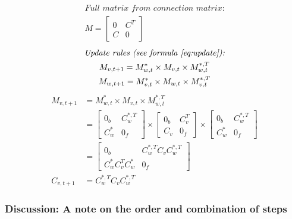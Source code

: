 \documentclass{article}
\begin{document}
\begin{equation}
\begin{gathered}
    \textit{Full matrix from connection matrix:} \\
    M = \begin{bmatrix}
            0 & C^T \\
            C & 0
        \end{bmatrix} 
\end{gathered}
\end{equation}
\begin{equation}
\begin{gathered}
    \textit{Update rules (see formula~\ref{eq:update}):} \\
    M_{v, t+1} = M^*_{w, t} \times M_{v, t} \times M^{*,T}_{w, t} \\
    M_{w, t+1} = M^*_{v, t} \times M_{w, t} \times M^{*,T}_{v, t}
\end{gathered}
\end{equation}
\begin{equation}
\begin{aligned}
    M_{v, t+1} &= M^*_{w, t} \times M_{v, t} \times M^{*,T}_{w, t} \\
               &= \begin{bmatrix}
                   0_b & C^{*,T}_w \\
                   C^*_w & 0_f
               \end{bmatrix} \times 
               \begin{bmatrix}
                   0_b & C^T_v \\
                   C_v & 0_f
               \end{bmatrix} \times
               \begin{bmatrix} 
                   0_b & C^{*,T}_w \\
                   C^*_w & 0_f
               \end{bmatrix} \\
               &= \begin{bmatrix}
                   0_b & C^{*,T}_w C_v C^{*,T}_w \\
                   C^*_w C^T_v C^*_w & 0_f
                   \end{bmatrix} \\
     C_{v,t+1} &= C^{*,T}_w C_v C^{*,T}_w
\end{aligned}
\end{equation}

\subsubsection{Discussion: A note on the order and combination of steps}
\end{document}
